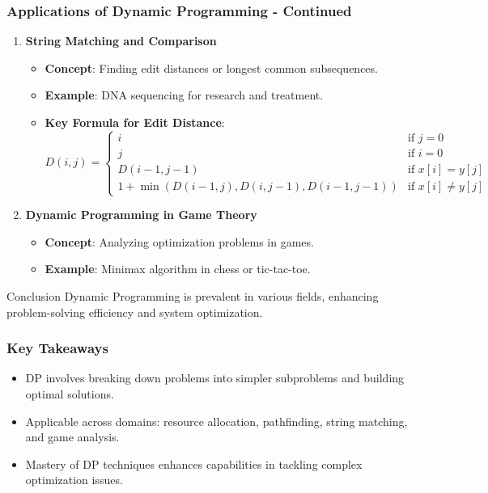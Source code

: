 \documentclass[aspectratio=169]{beamer}
\begin{document}
\begin{frame}[fragile]
    \frametitle{Applications of Dynamic Programming - Continued}

    \begin{enumerate}[resume]
        \item \textbf{String Matching and Comparison}
        \begin{itemize}
            \item \textbf{Concept}: Finding edit distances or longest common subsequences.
            \item \textbf{Example}: DNA sequencing for research and treatment.
            \item \textbf{Key Formula for Edit Distance}:
            \begin{equation}
            D(i, j) = 
            \begin{cases} 
            i & \text{if } j=0 \\ 
            j & \text{if } i=0 \\ 
            D(i-1, j-1) & \text{if } x[i] = y[j] \\ 
            1 + \min(D(i-1,j), D(i,j-1), D(i-1,j-1)) & \text{if } x[i] \neq y[j] 
            \end{cases}
            \end{equation}
        \end{itemize}

        \item \textbf{Dynamic Programming in Game Theory}
        \begin{itemize}
            \item \textbf{Concept}: Analyzing optimization problems in games.
            \item \textbf{Example}: Minimax algorithm in chess or tic-tac-toe.
        \end{itemize}
    \end{enumerate}
    
    \begin{block}{Conclusion}
        Dynamic Programming is prevalent in various fields, enhancing problem-solving efficiency and system optimization.
    \end{block}
\end{frame}

\begin{frame}[fragile]
    \frametitle{Key Takeaways}
    \begin{itemize}
        \item DP involves breaking down problems into simpler subproblems and building optimal solutions.
        \item Applicable across domains: resource allocation, pathfinding, string matching, and game analysis.
        \item Mastery of DP techniques enhances capabilities in tackling complex optimization issues.
    \end{itemize}
\end{frame}
\end{document}
